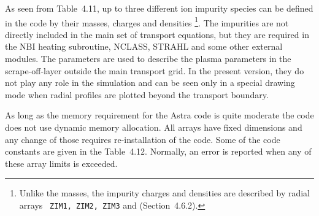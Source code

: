 As seen from Table~4.11, up to three different ion impurity species
can be defined in the code by their masses, charges and densities
\footnote[1]{Unlike the masses, the impurity charges and densities are
described by radial arrays {\tt~ZIM1, ZIM2, ZIM3} and
 (Section~4.6.2).}.
The impurities are not directly included in the main set of transport
equations, but they are required in the NBI heating subroutine, NCLASS,
STRAHL and some other external modules. 
The parameters  are used to describe the plasma
parameters  in the scrape-off-layer outside the main
transport grid.
In the present version, they do not play any role in the simulation and
can be seen only in a special drawing mode when radial profiles are
plotted beyond the transport boundary. 

As long as the memory requirement for the Astra code is quite moderate
the code does not use dynamic memory allocation. 
All arrays have fixed dimensions and any change of those requires
re-installation of the code. 
Some of the code constants are given in the Table~4.12.
Normally, an error is reported when any of these array limits is
exceeded. 

